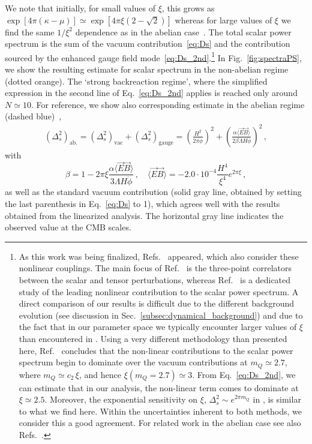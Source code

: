 We note that initially, for small values of $\xi$, this grows as $\exp[4 \pi (\kappa - \mu)] \simeq \exp[4 \pi \xi (2 - \sqrt{2})]$ whereas for large values of $\xi$ we find the same $1/\xi^2$ dependence as in the abelian case~\cite{Linde:2012bt}. The total scalar power spectrum is the sum of the vacuum contribution~\eqref{eq:Ds} and the contribution sourced by the enhanced gauge field mode~\eqref{eq:Ds_2nd}.\footnote{{As this work was being finalized, Refs.~\cite{Dimastrogiovanni:2018xnn,Papageorgiou:2018rfx} appeared, which also consider these nonlinear couplings. The main focus of Ref.~\cite{Dimastrogiovanni:2018xnn} is the three-point correlators between the scalar and tensor perturbations, whereas Ref.~\cite{Papageorgiou:2018rfx} is a dedicated study of the leading nonlinear contribution to the scalar power spectrum.  A direct comparison of our results is difficult due to the different background evolution (see discussion in Sec.~\ref{subsec:dynamical_background}) and due to the fact that in our parameter space we typically encounter larger values of $\xi$ than encountered in \cite{Papageorgiou:2018rfx}. Using a very different methodology than presented here, Ref.~\cite{Papageorgiou:2018rfx} concludes that the non-linear contributions to the scalar power spectrum begin to dominate over the vacuum contributions at  $m_Q \simeq 2.7$, where  $m_Q \simeq c_2 \, \xi$, {and hence $\xi (m_Q = 2.7) \simeq 3$. From Eq.~\eqref{eq:Ds_2nd}, we can estimate that in our analysis, the non-linear term comes to dominate at $\xi \simeq 2.5$.   Moreover, the exponential sensitivity on $\xi$, $\Delta_s^2 \sim e^{2 \pi m_Q}$ in \cite{Papageorgiou:2018rfx}, is similar to what we find here. 
Within the uncertainties inherent to both methods, we consider this a  good agreement.}  For related work in the abelian case see also Refs.~\cite{Barnaby:2010vf,Barnaby:2011vw}.}

} In  Fig.~\ref{fig:spectraPS}, we show the resulting estimate for scalar spectrum in the non-abelian regime (dotted orange). The `strong backreaction regime', where the simplified expression in the second line of Eq.~\eqref{eq:Ds_2nd} applies is reached only around $N \simeq 10$. For reference, we show also corresponding estimate in the abelian regime (dashed blue)~\cite{Linde:2012bt},
\begin{align}
 (\Delta_s^2)_\text{ab.}  = (\Delta_s^2)_\text{vac} +  (\Delta_s^2)_\text{gauge} = \left( \frac{H^2}{2 \pi \dot \phi}\right)^2 + \left(\frac{ \alpha \langle \vec E \vec B \rangle}{2 \beta \Lambda H \dot \phi} \right)^2 \,, 
\end{align}
with
\begin{equation}
 \beta = 1 - 2 \pi \xi \frac{\alpha \langle \vec E \vec B \rangle}{3 \Lambda H \dot \phi} \,, \quad  \langle \vec E \vec B \rangle = - 2.0 \cdot 10^{-4} \frac{H^4}{\xi^4} e^{2 \pi \xi} \,,
\end{equation}
as well as  the standard vacuum contribution (solid gray line, obtained by setting the last parenthesis in Eq.~\eqref{eq:Ds} to 1), which agrees well with the results obtained from the linearized analysis. The horizontal gray line indicates the observed value at the CMB scales. 


